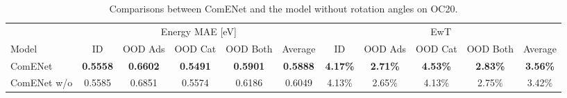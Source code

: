 \documentclass{article}
\begin{document}
\begin{table*}[ht]
\vspace{-5 pt}
    \begin{center}
        \caption{Comparisons between ComENet and the model without rotation angles  on OC20.
        }
        \vspace{-5 pt}
    \label{tb:ablation_oc20}
    \resizebox{\textwidth}{!}
{\color{COLOR}\begin{tabular}{l | ccccc | ccccc  }
    \toprule
    &\multicolumn{5}{c|}{Energy MAE [eV] } & \multicolumn{5}{c}{EwT }  \\
    \cmidrule(l{4pt}r{4pt}){2-6}
    \cmidrule(l{4pt}r{4pt}){7-11}
Model & ID &  OOD Ads & OOD Cat & OOD Both &Average& ID &  OOD Ads & OOD Cat & OOD Both &Average\\
\midrule
ComENet &\textbf{0.5558} &\textbf{0.6602} &\textbf{0.5491} &\textbf{0.5901} &\textbf{0.5888} &\textbf{4.17\%} &\textbf{2.71\%} & \textbf{4.53\%} &\textbf{2.83\%} & \textbf{3.56\%} \\
ComENet w/o  & 0.5585 & 0.6851 & 0.5574 & 0.6186 & 0.6049 & 4.13\% & 2.65\% & 4.13\% & 2.75\% & 3.42\% \\
\bottomrule
\end{tabular}}
\end{center}
\vspace{-10 pt}
\end{table*}
\end{document}
